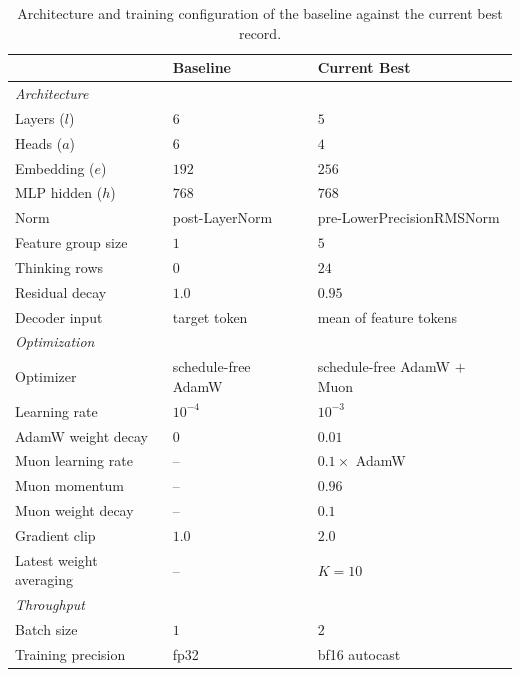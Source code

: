 \documentclass{article}
\theoremstyle{plain}
\theoremstyle{definition}
\theoremstyle{remark}
\begin{document}
\begin{table}[h]
\centering
\small
\caption{Architecture and training configuration of the baseline against the current best record.}
\label{tab:configs}
\begin{tabular}{@{}lll@{}}
  \toprule
  & Baseline & Current Best \\
  \midrule
  \multicolumn{3}{l}{\textit{Architecture}} \\
  Layers ($l$)              & $6$              & $5$ \\
  Heads ($a$)               & $6$              & $4$ \\
  Embedding ($e$)           & $192$            & $256$ \\
  MLP hidden ($h$)          & $768$            & $768$ \\
  Norm                      & post-LayerNorm   & pre-LowerPrecisionRMSNorm \\
  Feature group size        & $1$              & $5$ \\
  Thinking rows             & $0$              & $24$ \\
  Residual decay            & $1.0$            & $0.95$ \\
  Decoder input             & target token     & mean of feature tokens \\
  \midrule
  \multicolumn{3}{l}{\textit{Optimization}} \\
  Optimizer                 & schedule-free AdamW & schedule-free AdamW $+$ Muon \\
  Learning rate             & $10^{-4}$        & $10^{-3}$ \\
  AdamW weight decay        & $0$              & $0.01$ \\
  Muon learning rate        & --               & $0.1\times$ AdamW \\
  Muon momentum             & --               & $0.96$ \\
  Muon weight decay         & --               & $0.1$ \\
  Gradient clip             & $1.0$            & $2.0$ \\
  Latest weight averaging   & --               & $K{=}10$\\
  \midrule
  \multicolumn{3}{l}{\textit{Throughput}} \\
  Batch size                & $1$              & $2$ \\
  Training precision        & fp32             & bf16 autocast \\
  \bottomrule
\end{tabular}
\end{table}
\end{document}
